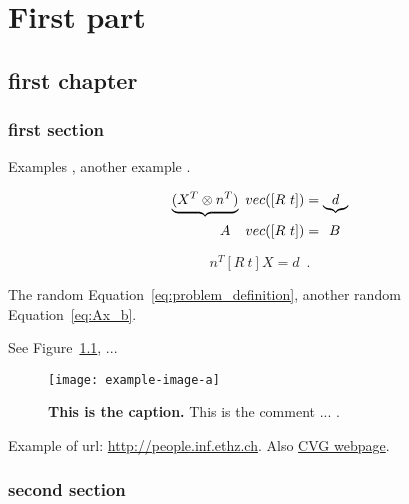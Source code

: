 \documentclass[a5paper,twoside,headsepline,pagesize,10pt,DIV=12]{scrbook}
\begin{document}
    


\frontmatter

    
    
    


\mainmatter

\part{First part}
\chapter{first chapter}
    \section{first section}
    Examples \cite{kneip2013, kneip2014openGV}, another example \cite{asa, camposeco2018}.

    \begin{align}
        \underbrace{(X^T\otimes n^T)} \,\, vec([R ~ t]) &= \underbrace{d} \\
        A \hspace*{2.5ex} vec([R ~ t]) &= \hspace*{1ex} B
        \label{eq:Ax_b}
    \end{align}

    \begin{equation}
    n^T [R~t] X = d \enspace .
    \label{eq:problem_definition}
    \end{equation}

    The random Equation~\eqref{eq:problem_definition}, another random Equation~\eqref{eq:Ax_b}.

    See Figure~\ref{fig:figer}, ...
    \begin{figure}[!h]
        \centering
        \texttt{[image: example-image-a]}
        \caption{\textbf{This is the caption.} This is the comment ... .}
        \label{fig:figer}
    \end{figure}

    Example of url: {\small\url{http://people.inf.ethz.ch}}. Also \href{http://people.inf.ethz.ch}{CVG webpage}.
    \lipsum[1-10]
    \section{second section}
    \lipsum[1-10]
\end{document}
